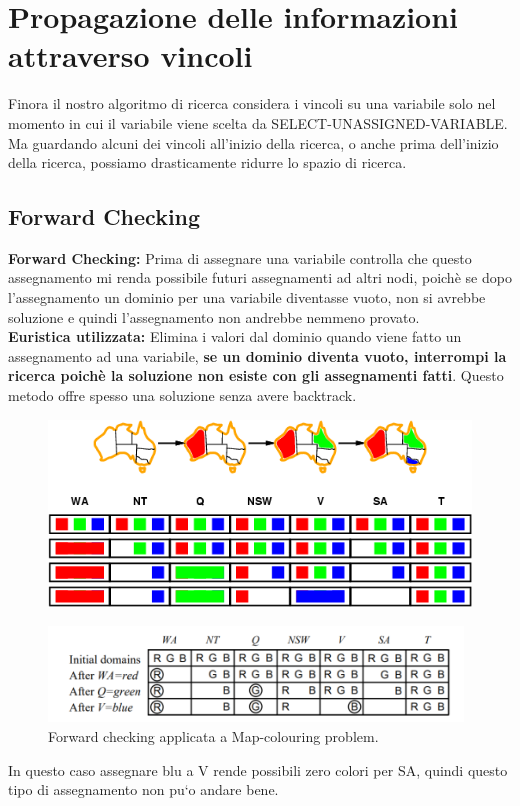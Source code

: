 \section{Propagazione delle informazioni attraverso vincoli}
Finora il nostro algoritmo di ricerca considera i vincoli su una variabile solo nel momento in cui il variabile viene scelta da SELECT-UNASSIGNED-VARIABLE. Ma guardando alcuni dei vincoli all’inizio della ricerca, o anche prima dell’inizio della ricerca, possiamo drasticamente ridurre lo spazio di ricerca.
\subsection{Forward Checking}
\textbf{Forward Checking: }  Prima di assegnare una variabile controlla che questo assegnamento mi renda possibile futuri assegnamenti ad altri nodi, poichè se dopo l’assegnamento un dominio per una variabile diventasse vuoto, non si avrebbe soluzione e quindi l’assegnamento non andrebbe nemmeno provato.
\\\textbf{Euristica utilizzata: }  Elimina i valori dal dominio quando viene fatto un
assegnamento ad una variabile, \textbf{se un dominio diventa vuoto, interrompi la ricerca poichè la soluzione non esiste con gli assegnamenti fatti}. Questo metodo offre spesso una soluzione senza avere backtrack.
\begin{figure}[htp]
    \centering
    \includegraphics[width=12cm, keepaspectratio]{latex/img/Cap2/forwod1.png}
\end{figure}
\begin{figure}[htp]
    \centering
    \includegraphics[width=11cm, keepaspectratio]{img/Cap2/f2.png}
    \caption{Forward checking applicata a Map-colouring problem.}
\end{figure}
\newpage
In questo caso assegnare blu a V rende possibili zero colori per SA, quindi questo tipo di assegnamento non pu`o andare bene.

